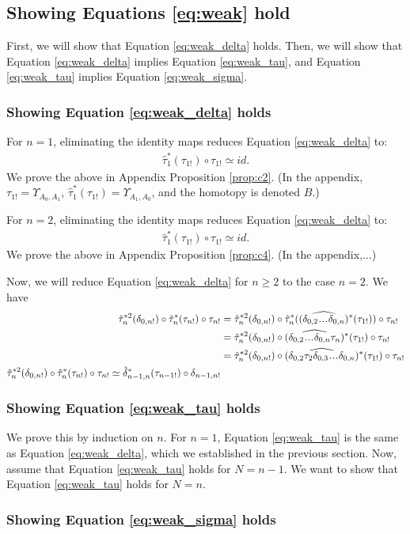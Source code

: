 \subsection{Showing Equations \ref{eq:weak} hold}
First, we will show that Equation 
\ref{eq:weak_delta} holds. Then, we will 
show that Equation 
\ref{eq:weak_delta} implies Equation 
\ref{eq:weak_tau}, and Equation \ref{eq:weak_tau} 
implies Equation \ref{eq:weak_sigma}.

\subsubsection{Showing Equation \ref{eq:weak_delta} holds}
For $n=1$, eliminating the identity 
maps reduces Equation \ref{eq:weak_delta} to:
\begin{align*} 
\hat{\tau}_1^*(\tau_{1!}) \circ \tau_{1!} 
\simeq id.
\end{align*}
We prove the above in Appendix Proposition 
\ref{prop:c2}. (In the appendix, 
$\tau_{1!} = \Upsilon_{A_0,A_1}$, 
$\hat{\tau}_1^*(\tau_{1!}) = \Upsilon_{A_1,A_0}$, 
and the homotopy is denoted $B$.)

For $n=2$, eliminating the identity 
maps reduces Equation \ref{eq:weak_delta} to:
\begin{align*} 
\hat{\tau}_1^*(\tau_{1!}) \circ \tau_{1!} 
\simeq id.
\end{align*}
We prove the above in Appendix Proposition 
\ref{prop:c4}. (In the appendix,...)

Now, we will reduce Equation 
\ref{eq:weak_delta} for $n\geq 2$ to the case 
$n=2$. We have
\begin{align*}
\hat{\tau}_n^{*2}(\delta_{0,n!}) \circ 
  \hat{\tau}_n^*(\tau_{n!}) \circ \tau_{n!}   
&=  
\hat{\tau}_n^{*2}(\delta_{0,n!}) \circ 
  \hat{\tau}_n^*(
  (\widehat{\delta_{0,2}\smdots\delta_{0,n}})^*(\tau_{1!})) 
  \circ \tau_{n!} \\
&=   
\hat{\tau}_n^{*2}(\delta_{0,n!}) \circ 
  (\widehat{\delta_{0,2}\smdots\delta_{0,n}\tau_n})^*(\tau_{1!}) 
  \circ \tau_{n!} \\
&=
\hat{\tau}_n^{*2}(\delta_{0,n!}) \circ 
  (\widehat{\delta_{0,2}\tau_2\delta_{0,3}\smdots\delta_{0,n}})^*(\tau_{1!}) 
  \circ \tau_{n!} \\
\hat{\tau}_n^{*2}(\delta_{0,n!}) \circ 
  \hat{\tau}_n^*(\tau_{n!}) \circ \tau_{n!}   
\simeq 
\hat{\delta}_{n-1,n}^*(\tau_{n-1!}) \circ \delta_{n-1,n!}
\end{align*}
%
\subsubsection{Showing Equation \ref{eq:weak_tau} holds}
We prove this by induction on $n$. For $n=1$, 
Equation \ref{eq:weak_tau} is the same as 
Equation \ref{eq:weak_delta}, which we 
established in the previous section. Now, 
assume that Equation \ref{eq:weak_tau} holds 
for $N=n-1$. We want to show that Equation 
\ref{eq:weak_tau} holds for $N=n$.
%
\subsubsection{Showing Equation \ref{eq:weak_sigma} holds}